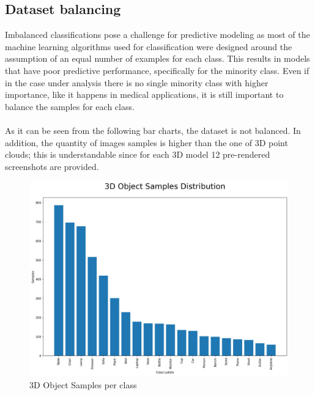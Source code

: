 \documentclass[11pt,a4paper]{article}
\begin{document}
\subsection{Dataset balancing}
Imbalanced classifications pose a challenge for predictive modeling as most of the machine learning algorithms used for classification were designed around the assumption of an equal number of examples for each class. This results in models that have poor predictive performance, specifically for the minority class. Even if in the case under analysis there is no single minority class with higher importance, like it happens in medical applications, it is still important to balance the samples for each class.\\
\\
As it can be seen from the following bar charts, the dataset is not balanced. In addition, the quantity of images samples is higher than the one of 3D point clouds; this is understandable since for each 3D model 12 pre-rendered screenshots are provided.
\begin{figure}[H]
    \centering
    \includegraphics[scale=0.35]{imgs/3d-object-samples-distribution.jpg}
    \caption{3D Object Samples per class}
\end{figure}
\end{document}
